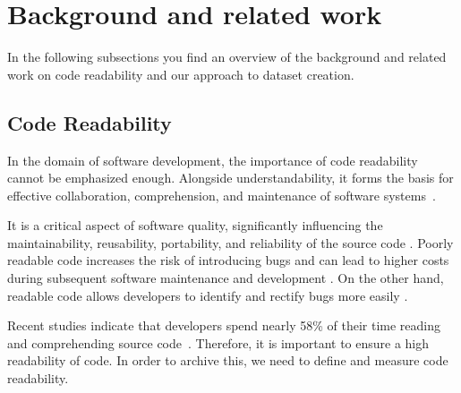 \documentclass[%
class=scrreprt,
chapterprefix=false,%
open=right,%
twoside=false,%
paper=a4,%
logofile={Logo\_zentral\_farbig\_EN.png},%
thesistype=master,%
UKenglish,%
]{se2thesis}
\theoremstyle{definition}
\begin{document}
\section{Background and related work} \label{Background and related work}
	In the following subsections you find an overview of the background and related work on code readability and our approach to dataset creation.
	
\subsection{Code Readability} \label{Readability}
		
	In the domain of software development, the importance of code readability cannot be emphasized enough. Alongside understandability, it forms the basis for effective collaboration, comprehension, and maintenance of software systems~\cite{posnett2011simpler, aggarwal2002integrated}.
	
	It is a critical aspect of software quality, significantly influencing the maintainability, reusability, portability, and reliability of the source code \cite{alawad2019empirical, sedano2016code}. Poorly readable code increases the risk of introducing bugs \cite{mannan2018towards, scalabrino2018comprehensive} and can lead to higher costs during subsequent software maintenance and development \cite{johnson2019empirical}. On the other hand, readable code allows developers to identify and rectify bugs more easily \cite{mi2023graph}.
	
	Recent studies indicate that developers spend nearly 58\% of their time reading and comprehending source code~\cite{buse2009learning, deimel1985uses, rugaber2000use, boehm2001defect, tashtoush2013impact, sedano2016code, xia2017measuring}.
	Therefore, it is important to ensure a high readability of code. In order to archive this, we need to define and measure code readability.
	
\end{document}
